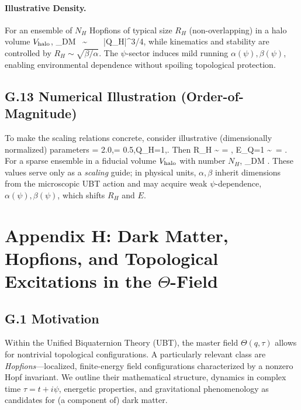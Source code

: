 \documentclass[12pt,a4paper]{article}
\numberwithin{equation}{section}
\theoremstyle{definition}
\theoremstyle{remark}
\begin{document}
\paragraph{Illustrative Density.} For an ensemble of $N_H$ Hopfions of typical size $R_H$ (non-overlapping) in a halo volume $V_{\rm halo}$,
\rho_{\rm DM} \;\approx\;  \ \sim\  \ \kappa\, \sqrt{\alpha\beta}\, |Q_H|^{3/4},
while kinematics and stability are controlled by $R_H\!\sim\!\sqrt{\beta/\alpha}$. The $\psi$-sector induces mild running $\alpha(\psi),\beta(\psi)$, enabling environmental dependence without spoiling topological protection.
\subsection*{G.13 Numerical Illustration (Order-of-Magnitude)}
To make the scaling relations concrete, consider illustrative (dimensionally normalized) parameters
\alpha = 2.0,\qquad \beta = 0.5,\qquad Q_H=1,\qquad \kappa {}.
Then
R_H \sim \sqrt{\frac{\beta}{\alpha}} \;=\;  \;\approx{},\qquad
E_{Q=1} \sim \kappa\,\sqrt{\alpha\beta} \;=\;  \;\approx{}.
For a sparse ensemble in a fiducial volume $V_{\rm halo}$ with number $N_H$,
\rho_{\rm DM} \;\approx\;  \;\approx\; .
These values serve only as a \emph{scaling} guide; in physical units, $\alpha,\beta$ inherit dimensions from the microscopic UBT action and may acquire weak $\psi$-dependence, $\alpha(\psi),\beta(\psi)$, which shifts $R_H$ and $E$.

\appendix
\section*{Appendix H: Dark Matter, Hopfions, and Topological Excitations in the $\Theta$-Field}

\subsection*{G.1 Motivation}
Within the Unified Biquaternion Theory (UBT), the master field $\Theta(q,\tau)$ allows for nontrivial topological configurations. 
A particularly relevant class are \emph{Hopfions}---localized, finite-energy field configurations characterized by a nonzero Hopf invariant. 
We outline their mathematical structure, dynamics in complex time $\tau=t+i\psi$, energetic properties, and gravitational phenomenology as candidates for (a component of) dark matter.
\end{document}

